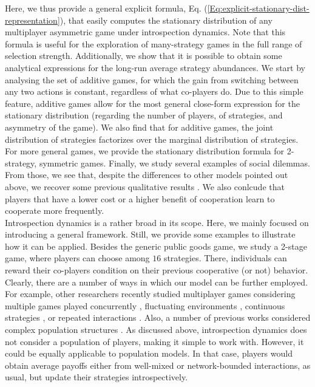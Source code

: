 \documentclass[11pt]{article}
\theoremstyle{plainCl1}
\theoremstyle{plainCl2}
\begin{document}

\noindent Here, we thus provide a general explicit formula, Eq. (\ref{Eq:explicit-stationary-dist-representation}), that easily computes the stationary distribution of any multiplayer asymmetric game under introspection dynamics. Note that this formula is useful for the exploration of many-strategy games in the full range of selection strength.
Additionally, we show that it is possible to obtain some analytical expressions for the long-run average strategy abundances.
We start by analysing the set of additive games, for which the gain from switching between any two actions is constant, regardless of what co-players do. 
Due to this simple feature, additive games allow for the most general close-form expression for the stationary distribution (regarding the number of players, of strategies, and asymmetry of the game). 
We also find that for additive games, the joint distribution of strategies factorizes over the marginal distribution of strategies. 
For more general games, we provide the stationary distribution formula for 2-strategy, symmetric games.
Finally, we study several examples of social dilemmas. From those, we see that, despite the differences to other models pointed out above, we recover some previous qualitative results \cite{Hauert:JTB:2006a}. We also conlcude that players that have a lower cost or a higher benefit of cooperation learn to cooperate more frequently. \\ 

\noindent Introspection dynamics is a rather broad in its scope. Here, we mainly focused on introducing a general framework. Still, we provide some examples to illustrate how it can be applied. Besides the generic public goods game, we study a 2-stage game, where players can choose among $16$ strategies. There, individuals can reward their co-players condition on their previous cooperative (or not) behavior.
\noindent Clearly, there are a number of ways in which our model can be further employed. For example, other researchers recently studied multiplayer games considering multiple games played concurrently \cite{Venkateswaran:PRSB:2019}, fluctuating environments \cite{Baron:JRSOP:2018}, continuous strategies \cite{Molina:JMB:2017}, or repeated interactions \cite{Hilbe:JTB:2015}. Also, a number of previous works considered complex population structures \cite{Broom:JTB:2012, Wu:Games:2013, Perc:JRSI:2013, Pena:JTB:2015, Pena:JRSI:2016, Pattni:JTB:2017, Su:PNAS:2022}. As discussed above, introspection dynamics does not consider a population of players, making it simple to work with. However, it could be equally applicable to population models. In that case, players would obtain average payoffs either from well-mixed or network-bounded interactions, as usual, but update their strategies introspectively.
\end{document}
